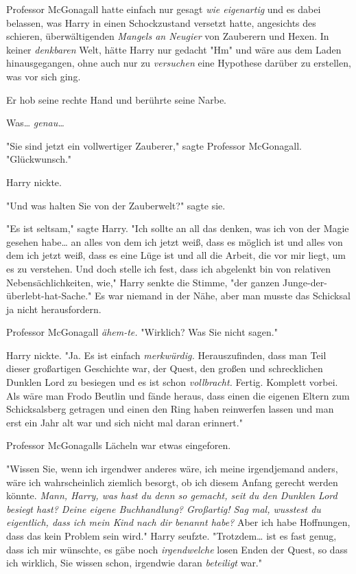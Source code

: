 {Professor McGonagall hatte einfach nur gesagt \emph{wie eigenartig} und es dabei belassen, was Harry in einen Schockzustand versetzt hatte, angesichts des schieren, überwältigenden \emph{Mangels an Neugier} von Zauberern und Hexen. In keiner \emph{denkbaren} Welt, hätte Harry nur gedacht "Hm" und wäre aus dem Laden hinausgegangen, ohne auch nur zu \emph{versuchen} eine Hypothese darüber zu erstellen, was vor sich ging.

Er hob seine rechte Hand und berührte seine Narbe.

Was… \emph{genau…}

"Sie sind jetzt ein vollwertiger Zauberer," sagte Professor McGonagall. "Glückwunsch."

Harry nickte.

"Und was halten Sie von der Zauberwelt?" sagte sie.

"Es ist seltsam," sagte Harry. "Ich sollte an all das denken, was ich von der Magie gesehen habe… an alles von dem ich jetzt weiß, dass es möglich ist und alles von dem ich jetzt weiß, dass es eine Lüge ist und all die Arbeit, die vor mir liegt, um es zu verstehen. Und doch stelle ich fest, dass ich abgelenkt bin von relativen Nebensächlichkeiten, wie," Harry senkte die Stimme, "der ganzen Junge-der-überlebt-hat-Sache." Es war niemand in der Nähe, aber man musste das Schicksal ja nicht herausfordern.

Professor McGonagall \emph{ähem-te.} "Wirklich? Was Sie nicht sagen."

Harry nickte. "Ja. Es ist einfach \emph{merkwürdig.} Herauszufinden, dass man Teil dieser großartigen Geschichte war, der Quest, den großen und schrecklichen Dunklen Lord zu besiegen und es ist schon \emph{vollbracht.} Fertig. Komplett vorbei. Als wäre man Frodo Beutlin und fände heraus, dass einen die eigenen Eltern zum Schicksalsberg getragen und einen den Ring haben reinwerfen lassen und man erst ein Jahr alt war und sich nicht mal daran erinnert."

Professor McGonagalls Lächeln war etwas eingeforen.

"Wissen Sie, wenn ich irgendwer anderes wäre, ich meine irgendjemand anders, wäre ich wahrscheinlich ziemlich besorgt, ob ich diesem Anfang gerecht werden könnte. \emph{Mann, Harry, was hast du denn so gemacht, seit du den Dunklen Lord besiegt hast? Deine eigene Buchhandlung? Großartig! Sag mal, wusstest du eigentlich, dass ich mein Kind nach dir benannt habe?} Aber ich habe Hoffnungen, dass das kein Problem sein wird." Harry seufzte. "Trotzdem… ist es fast genug, dass ich mir wünschte, es gäbe noch \emph{irgendwelche} losen Enden der Quest, so dass ich wirklich, Sie wissen schon, irgendwie daran \emph{beteiligt} war."

}
